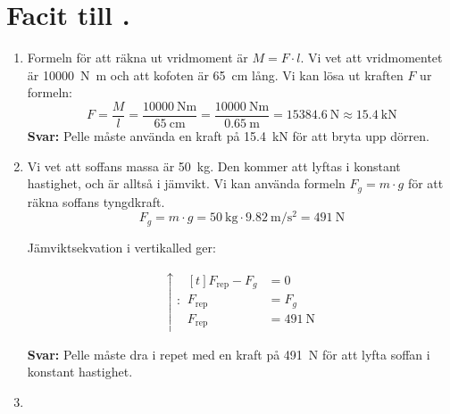 \documentclass[11pt]{article}
\begin{document}
\raggedright

\section*{Facit till \lessonNumber. \lessonName}
\begin{enumerate}[itemsep=2em]
        \item
              \raggedright
              Formeln för att räkna ut vridmoment är $M = F \cdot l$. Vi vet att vridmomentet är \SI{10 000}{\newton\meter} och att kofoten är \SI{65}{\centi\meter} lång. Vi kan lösa ut kraften $F$ ur formeln:
              \begin{equation*}
                      F = \frac{M}{l} = \frac{\SI{10 000}{\newton\meter}}{\SI{65}{\centi\meter}} = \frac{{\SI{10 000}{\newton\meter}}}{{\SI{0.65}{\meter}}} = \SI{15384.6}{\newton} \approx \SI{15.4}{\kilo\newton}
              \end{equation*}
              \textbf{Svar:} Pelle måste använda en kraft på \SI{15.4}{\kilo\newton} för att bryta upp dörren.
        \item
              \raggedright
              Vi vet att soffans massa är \SI{50}{\kilo\gram}. Den kommer att lyftas i konstant hastighet, och är alltså i jämvikt. Vi kan använda formeln $F_g = m \cdot g$ för att räkna soffans tyngdkraft.
              \begin{equation*}
                      F_g = m \cdot g = \SI{50}{\kilo\gram} \cdot \SI{9.82}{\meter\per\second\squared} = \SI{491}{\newton}
              \end{equation*}
              \begin{minipage}[c]{0.4\textwidth}
                      Jämviktsekvation i vertikalled ger:
              \end{minipage}
              \begin{minipage}[c]{0.4\textwidth}
                      \begin{align*}
                              \uparrow : \begin{aligned}[t]
                                                 F_{\text{rep}} - F_g & = 0                 \\
                                                 F_{\text{rep}}       & = F_g               \\
                                                 F_{\text{rep}}       & = \SI{491}{\newton}
                                         \end{aligned}
                      \end{align*}
              \end{minipage}

              \textbf{Svar:} Pelle måste dra i repet med en kraft på \SI{491}{\newton} för att lyfta soffan i konstant hastighet.

        \item

\end{enumerate}
\vfill
\begin{center}
\end{center}
\end{document}
